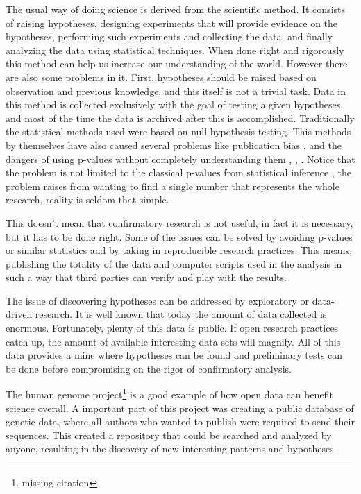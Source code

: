 The usual way of doing science is derived from the scientific method. It consists of raising hypotheses, designing experiments that will provide evidence on the hypotheses, performing such experiments and collecting the data, and finally analyzing the data using statistical techniques. When done right and rigorously this method can help us increase our understanding of the world. However there are also some problems in it. First, hypotheses should be raised based on observation and previous knowledge, and this itself is not a trivial task. Data in this method is collected exclusively with the goal of testing a given hypotheses, and most of the time the data is archived after this is accomplished. Traditionally the statistical methods used were based on null hypothesis testing. This methods by themselves have also caused several problems like publication bias \autocite{ioannidis_why_2005}, and the dangers of using p-values without completely understanding them \autocite{halsey_fickle_2015}, \autocite{nuzzo_scientific_2014}, \autocite{woolston_psychology_2015}. Notice that the problem is not limited to the classical p-values from statistical inference \autocite{gelman_so-called_2011}, the problem raises from wanting to find a single number that represents the whole research, reality is seldom that simple.    

This doesn't mean that confirmatory research is not useful, in fact it is necessary, but it has to be done right. Some of the issues can be solved by avoiding p-values or similar statistics and by taking in reproducible research practices. This means, publishing the totality of the data and computer scripts used in the analysis in such a way that third parties can verify and play with the results. 

The issue of discovering hypotheses can be addressed by exploratory or data-driven research. It is well known that today the amount of data collected is enormous. Fortunately, plenty of this data is public. If open research practices catch up, the amount of available interesting data-sets will magnify. All of this data provides a mine where hypotheses can be found and preliminary tests can be done before compromising on the rigor of confirmatory analysis. 

The human genome project\footnote{missing citation} is a good example of how open data can benefit science overall. A important part of this project was creating a public database of genetic data, where all authors who wanted to publish were required to send their sequences. This created a repository that could be searched and analyzed by anyone, resulting in the discovery of new interesting patterns and hypotheses.

